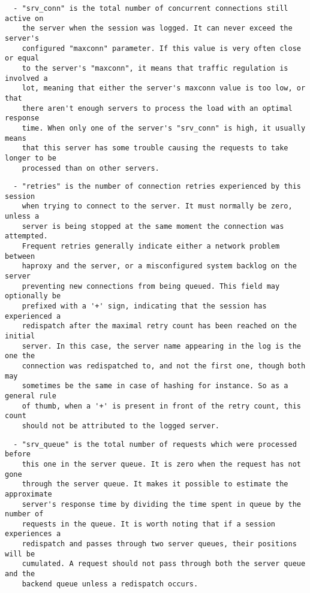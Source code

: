 \begin{verbatim}
  - "srv_conn" is the total number of concurrent connections still active on
    the server when the session was logged. It can never exceed the server's
    configured "maxconn" parameter. If this value is very often close or equal
    to the server's "maxconn", it means that traffic regulation is involved a
    lot, meaning that either the server's maxconn value is too low, or that
    there aren't enough servers to process the load with an optimal response
    time. When only one of the server's "srv_conn" is high, it usually means
    that this server has some trouble causing the requests to take longer to be
    processed than on other servers.
\end{verbatim}

\begin{verbatim}
  - "retries" is the number of connection retries experienced by this session
    when trying to connect to the server. It must normally be zero, unless a
    server is being stopped at the same moment the connection was attempted.
    Frequent retries generally indicate either a network problem between
    haproxy and the server, or a misconfigured system backlog on the server
    preventing new connections from being queued. This field may optionally be
    prefixed with a '+' sign, indicating that the session has experienced a
    redispatch after the maximal retry count has been reached on the initial
    server. In this case, the server name appearing in the log is the one the
    connection was redispatched to, and not the first one, though both may
    sometimes be the same in case of hashing for instance. So as a general rule
    of thumb, when a '+' is present in front of the retry count, this count
    should not be attributed to the logged server.
\end{verbatim}

\begin{verbatim}
  - "srv_queue" is the total number of requests which were processed before
    this one in the server queue. It is zero when the request has not gone
    through the server queue. It makes it possible to estimate the approximate
    server's response time by dividing the time spent in queue by the number of
    requests in the queue. It is worth noting that if a session experiences a
    redispatch and passes through two server queues, their positions will be
    cumulated. A request should not pass through both the server queue and the
    backend queue unless a redispatch occurs.
\end{verbatim}

